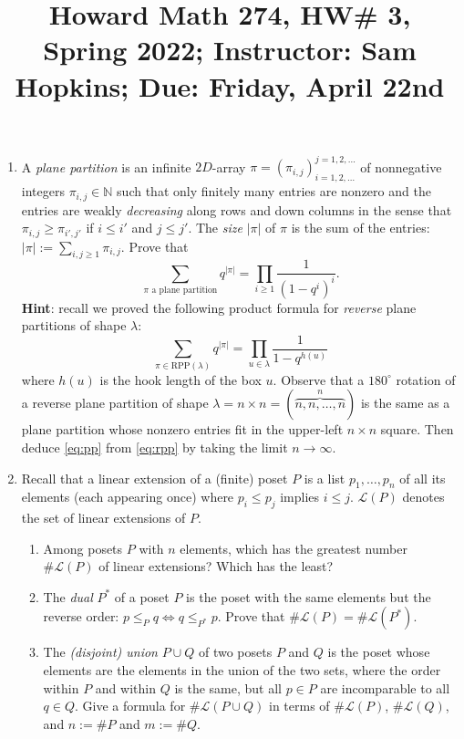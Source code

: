 \documentclass[11pt]{article}
\title{Howard Math 274, HW\# 3, \\ {\normalsize Spring 2022; Instructor: Sam Hopkins; Due: Friday, April 22nd}}
\date{}
\begin{document}
\maketitle

\thispagestyle{empty}

\vspace{-2cm}

\begin{enumerate}

\item A \emph{plane partition} is an infinite $2D$-array $\pi = (\pi_{i,j})_{i=1,2,\ldots}^{j=1,2,\ldots}$ of nonnegative integers $\pi_{i,j} \in \mathbb{N}$ such that only finitely many entries are nonzero and the entries are weakly \emph{decreasing} along rows and down columns in the sense that $\pi_{i,j} \geq \pi_{i',j'}$ if $i \leq i'$ and $j \leq j'$. The \emph{size} $|\pi|$ of $\pi$ is the sum of the entries: $|\pi| :=\sum_{i,j \geq 1} \pi_{i,j}$. Prove that 
\begin{equation} \label{eq:pp} \sum_{\textrm{$\pi$ a plane partition}} q^{|\pi|} = \prod_{i \geq 1} \frac{1}{(1-q^i)^i}. \end{equation}
{\bf Hint}: recall we proved the following product formula for \emph{reverse} plane partitions of shape $\lambda$:
\begin{equation} \label{eq:rpp} \sum_{\pi \in \mathrm{RPP}(\lambda)} q^{|\pi|} = \prod_{u \in \lambda} \frac{1}{1-q^{h(u)}} \end{equation}
where $h(u)$ is the hook length of the box $u$. Observe that a $180^\circ$ rotation of a reverse plane partition of shape $\lambda = n \times n = (\overbrace{n,n,\ldots,n}^{n})$ is the same as a plane partition whose nonzero entries fit in the upper-left $n\times n$ square. Then deduce \eqref{eq:pp} from \eqref{eq:rpp} by taking the limit $n\to \infty$.

\item Recall that a linear extension of a (finite) poset $P$ is a list $p_1,\ldots,p_n$ of all its elements (each appearing once) where $p_i \leq p_j$ implies $i \leq j$. $\mathcal{L}(P)$ denotes the set of linear extensions of $P$.
\begin{enumerate}
\item Among posets $P$ with $n$ elements, which has the greatest number $\#\mathcal{L}(P)$ of linear extensions? Which has the least?
\item The \emph{dual} $P^{*}$ of a poset $P$ is the poset with the same elements but the reverse order: $p \leq_{P} q \Leftrightarrow q \leq_{P^*} p$. Prove that $\#\mathcal{L}(P)=\#\mathcal{L}(P^*)$.
\item The \emph{(disjoint) union} $P \cup Q$ of two posets $P$ and $Q$ is the poset whose elements are the elements in the union of the two sets, where the order within $P$ and within $Q$ is the same, but all $p \in P$ are incomparable to all $q\in Q$. Give a formula for $\#\mathcal{L}(P\cup Q)$ in terms of $\#\mathcal{L}(P)$, $\#\mathcal{L}(Q)$, and $n := \#P$ and $m := \#Q$.
\end{enumerate}


\end{enumerate}
\end{document}
